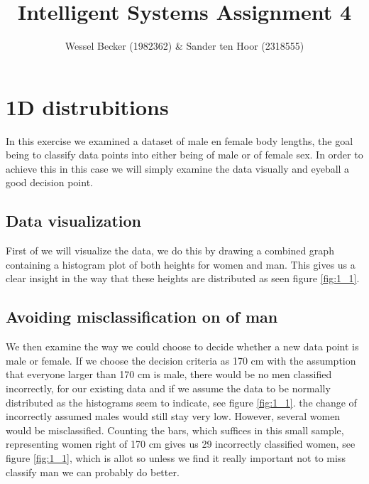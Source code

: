 \documentclass[10pt,a4paper]{article}
\begin{document}
\title{Intelligent Systems Assignment 4}
\author{Wessel Becker (1982362) \& Sander ten Hoor (2318555)}
\maketitle

\newcommand{\simplefigure}[3]{
	\begin{figure}[H]
  	\centering
    	\makebox[\textwidth]
    	{
    		\texttt{[image: \#1]}
 		} \\
  		\caption{#2}
  		\label{#3}
	\end{figure}
}
\newcommand{\mcode}[1]{
	
}

\section{1D distrubitions}
In this exercise we examined a dataset of male en female body lengths, the goal being to classify data points into either being of male or of female sex. In order to achieve this in this case we will simply examine the data visually and eyeball a good decision point.

\subsection{Data visualization}
First of we will visualize the data, we do this by drawing a combined graph containing a histogram plot of both heights for women and man. This gives us a clear insight in the way that these heights are distributed as seen figure \ref{fig:1_1}. 

\subsection{Avoiding misclassification on of man}
We then examine the way we could choose to decide whether a new data point is male or female. If we choose the decision criteria as 170 cm with the assumption that everyone larger than 170 cm is male, there would be no men classified incorrectly, for our existing data and if we assume the data to be normally distributed as the histograms seem to indicate, see figure \ref{fig:1_1}. the change of incorrectly assumed males would still stay very low. However, several women would be misclassified. Counting the bars, which suffices in this small sample, representing women right of 170 cm gives us 29 incorrectly classified women, see figure \ref{fig:1_1}, which is allot so unless we find it really important not to miss classify man we can probably do better.
\end{document}
